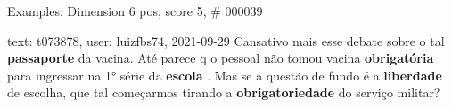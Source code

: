 \begin{frame}{Examples: Dimension 6 pos, score 5, \# 000039}
\footnotesize
\begin{exampleblock}{text: t073878, user: luizfbs74, 2021-09-29}
Cansativo mais esse debate sobre o tal \textbf{passaporte} da vacina. Até 
parece q o pessoal não tomou vacina \textbf{obrigatória} para ingressar na 1° 
série da \textbf{escola} . Mas se a questão de fundo é a \textbf{liberdade} de 
escolha, que tal começarmos tirando a \textbf{obrigatoriedade} do serviço 
militar? 
\end{exampleblock}
\end{frame}
